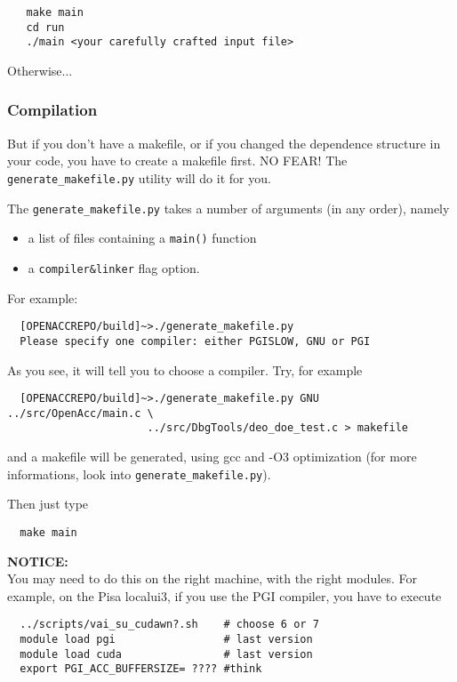 \documentclass[a4paper,10pt]{book}
\begin{document}
  \begin{verbatim}
   make main
   cd run
   ./main <your carefully crafted input file>
  \end{verbatim}
  Otherwise...

  
  \subsubsection{Compilation}
  But if you don't have a makefile, or if you changed the dependence
  structure in your code, you have to create a makefile first. NO FEAR! The 
  \verb|generate_makefile.py| utility will do it for you.

  The \verb|generate_makefile.py| takes a number of arguments (in any order), 
namely 
 \begin{itemize}
  \item a list of files containing a \verb|main()| function
  \item a \verb|compiler&linker| flag option.
 \end{itemize}

  
  For example:
  \begin{verbatim}
  [OPENACCREPO/build]~>./generate_makefile.py
  Please specify one compiler: either PGISLOW, GNU or PGI
 \end{verbatim}
  As you see, it will tell you to choose a compiler. Try, for example

  \begin{verbatim}
  [OPENACCREPO/build]~>./generate_makefile.py GNU ../src/OpenAcc/main.c \
                      ../src/DbgTools/deo_doe_test.c > makefile
 \end{verbatim}
  and a makefile will be generated, using gcc and -O3 optimization
  (for more informations, look into \verb|generate_makefile.py|). 

  Then just  type
  
  \begin{verbatim}
  make main
 \end{verbatim}
  {\bf NOTICE:}\\
  You may need to do this on the right machine, with the right modules.
  For example, on the Pisa localui3, if you use the PGI compiler,
  you have to execute
\begin{verbatim}
  ../scripts/vai_su_cudawn?.sh    # choose 6 or 7
  module load pgi                 # last version
  module load cuda                # last version
  export PGI_ACC_BUFFERSIZE= ???? #think
\end{verbatim}
\end{document}

